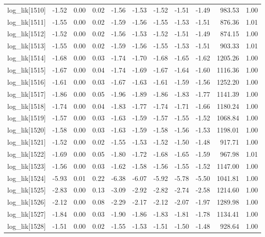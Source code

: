 \begin{table}[ht]
\begin{tabular}{rrrrrrrrrrr}
  log\_lik[1510] & -1.52 & 0.00 & 0.02 & -1.56 & -1.53 & -1.52 & -1.51 & -1.49 & 983.53 & 1.00 \\ 
  log\_lik[1511] & -1.55 & 0.00 & 0.02 & -1.59 & -1.56 & -1.55 & -1.53 & -1.51 & 876.36 & 1.01 \\ 
  log\_lik[1512] & -1.52 & 0.00 & 0.02 & -1.56 & -1.53 & -1.52 & -1.51 & -1.49 & 874.15 & 1.00 \\ 
  log\_lik[1513] & -1.55 & 0.00 & 0.02 & -1.59 & -1.56 & -1.55 & -1.53 & -1.51 & 903.33 & 1.01 \\ 
  log\_lik[1514] & -1.68 & 0.00 & 0.03 & -1.74 & -1.70 & -1.68 & -1.65 & -1.62 & 1205.26 & 1.00 \\ 
  log\_lik[1515] & -1.67 & 0.00 & 0.04 & -1.74 & -1.69 & -1.67 & -1.64 & -1.60 & 1116.36 & 1.00 \\ 
  log\_lik[1516] & -1.61 & 0.00 & 0.03 & -1.67 & -1.63 & -1.61 & -1.59 & -1.56 & 1252.20 & 1.00 \\ 
  log\_lik[1517] & -1.86 & 0.00 & 0.05 & -1.96 & -1.89 & -1.86 & -1.83 & -1.77 & 1141.39 & 1.00 \\ 
  log\_lik[1518] & -1.74 & 0.00 & 0.04 & -1.83 & -1.77 & -1.74 & -1.71 & -1.66 & 1180.24 & 1.00 \\ 
  log\_lik[1519] & -1.57 & 0.00 & 0.03 & -1.63 & -1.59 & -1.57 & -1.55 & -1.52 & 1068.84 & 1.00 \\ 
  log\_lik[1520] & -1.58 & 0.00 & 0.03 & -1.63 & -1.59 & -1.58 & -1.56 & -1.53 & 1198.01 & 1.00 \\ 
  log\_lik[1521] & -1.52 & 0.00 & 0.02 & -1.55 & -1.53 & -1.52 & -1.50 & -1.48 & 917.71 & 1.00 \\ 
  log\_lik[1522] & -1.69 & 0.00 & 0.05 & -1.80 & -1.72 & -1.68 & -1.65 & -1.59 & 967.98 & 1.01 \\ 
  log\_lik[1523] & -1.56 & 0.00 & 0.03 & -1.62 & -1.58 & -1.56 & -1.55 & -1.52 & 1147.00 & 1.00 \\ 
  log\_lik[1524] & -5.93 & 0.01 & 0.22 & -6.38 & -6.07 & -5.92 & -5.78 & -5.50 & 1041.81 & 1.00 \\ 
  log\_lik[1525] & -2.83 & 0.00 & 0.13 & -3.09 & -2.92 & -2.82 & -2.74 & -2.58 & 1214.60 & 1.00 \\ 
  log\_lik[1526] & -2.12 & 0.00 & 0.08 & -2.29 & -2.17 & -2.12 & -2.07 & -1.97 & 1289.98 & 1.00 \\ 
  log\_lik[1527] & -1.84 & 0.00 & 0.03 & -1.90 & -1.86 & -1.83 & -1.81 & -1.78 & 1134.41 & 1.00 \\ 
  log\_lik[1528] & -1.51 & 0.00 & 0.02 & -1.55 & -1.53 & -1.51 & -1.50 & -1.48 & 928.64 & 1.00 \\ 

\end{tabular}
\end{table}
